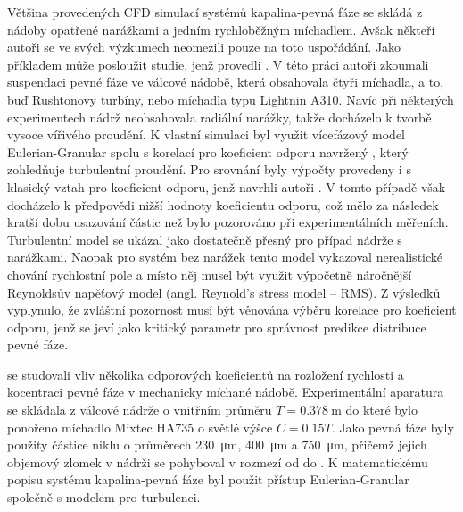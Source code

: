 Většina provedených CFD simulací systémů kapalina-pevná fáze se skládá z nádoby opatřené narážkami a jedním rychloběžným míchadlem. Avšak někteří autoři se ve svých výzkumech neomezili pouze na toto uspořádání. Jako příkladem může posloužit studie, jenž provedli \citet{mon04}. V této práci autoři zkoumali suspendaci pevné fáze ve válcové nádobě, která obsahovala čtyři míchadla, a to, buď Rushtonovy turbíny, nebo míchadla typu Lightnin A310. Navíc při některých experimentech nádrž neobsahovala radiální narážky, takže docházelo k tvorbě vysoce vířivého proudění. K vlastní simulaci byl využit vícefázový model Eulerian-Granular spolu s korelací pro koeficient odporu navržený \citet{pin01}, který zohledňuje turbulentní proudění. Pro srovnání byly výpočty provedeny i s klasický vztah pro koeficient odporu, jenž navrhli autoři \citet{schi32}. V tomto případě však docházelo k předpovědi nižší hodnoty koeficientu odporu, což mělo za následek kratší dobu usazování částic než bylo pozorováno při experimentálních měřeních. Turbulentní model \keps{} se ukázal jako dostatečně přesný pro případ nádrže s narážkami. Naopak pro systém bez narážek tento model vykazoval nerealistické chování rychlostní pole a místo něj musel být využit výpočetně náročnější Reynoldsův napěťový model (angl. Reynold's stress model -- RMS). Z výsledků vyplynulo, že zvláštní pozornost musí být věnována výběru korelace pro koeficient odporu, jenž se jeví jako kritický parametr pro správnost predikce distribuce pevné fáze.   

\citet{ochi08} se studovali vliv několika odporových koeficientů na rozložení rychlosti a kocentraci pevné fáze v mechanicky míchané nádobě. Experimentální aparatura se skládala z válcové nádrže o vnitřním průměru $T=\SI{0.378}{\meter}$ do které bylo ponořeno míchadlo Mixtec HA735 o světlé výšce $C=\num{0.15}T$. Jako pevná fáze byly použity částice niklu o průměrech \SI{230}{\micro\meter}, \SI{400}{\micro\meter} a \SI{750}{\micro\meter}, přičemž jejich objemový zlomek v nádrži se pohyboval v rozmezí od  do . K matematickému popisu systému kapalina-pevná fáze byl použit přístup Eulerian-Granular společně s modelem \keps{} pro turbulenci. 

   
